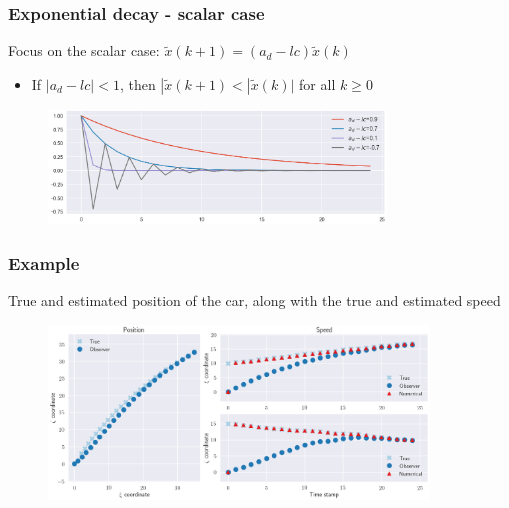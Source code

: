 \begin{frame}
	\frametitle{Exponential decay - scalar case}
	Focus on the scalar case: $\tilde{x}(k+1)= (a_d-lc)\tilde{x}(k)$	
	\begin{itemize}
		\item If $|a_d-lc|<1$, then $|\tilde{x}(k+1)< |\tilde{x}(k)|$ for all $k\geq0$
	\end{itemize}

	\begin{figure}[b]
		\includegraphics[width=0.8\textwidth]{fig/exponential_decay}
	\end{figure}
	
	
	
\end{frame}

\begin{frame}
    \frametitle{Example}
    True and estimated position of the car, along with the true and estimated speed
    \begin{figure}
    	\includegraphics[width=0.9\textwidth]{fig/observer_ex_1}
    \end{figure}
\end{frame}

